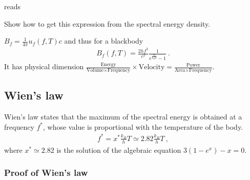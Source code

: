 \documentclass[letterpaper,10pt,english]{jupyterBook}
\begin{document}
\sphinxAtStartPar
{} reads%
\begin{footnote}[1]\sphinxAtStartFootnote
Show how to get this expression from the spectral energy density.
%
\end{footnote} \(B_f = \frac{1}{4 \pi} u_f(f,T) c\) and thus for a black\sphinxhyphen{}body
\begin{equation*}
\begin{split}B_{f}(f, T) = \frac{2 h f^3}{c^2}\frac{1}{e^{\frac{hf}{k_B T}} - 1} \ .\end{split}
\end{equation*}
\sphinxAtStartPar
It has physical dimension \(\frac{\text{Energy}}{\text{Volume} \times \text{Frequency}} \times \text{Velocity} = \frac{\text{Power}}{\text{Area} \times \text{Frequency}}\).


\subsection{Wien’s law}
\label{\detokenize{ch/heat-transfer-radiation:wien-s-law}}
\sphinxAtStartPar
Wien’s law states that the maximum of the spectral energy is obtained at a frequency \(f^*\), whose value is proportional with the temperature of the body.
\begin{equation*}
\begin{split}f^* = x^* \frac{k_B}{h} T \simeq 2.82  \frac{k_B}{h} T \ ,\end{split}
\end{equation*}
\sphinxAtStartPar
where \(x^* \simeq 2.82\) is the solution of the algebraic equation \(3(1-e^x)-x=0\).
\subsubsection*{Proof of Wien’s law}
\end{document}
